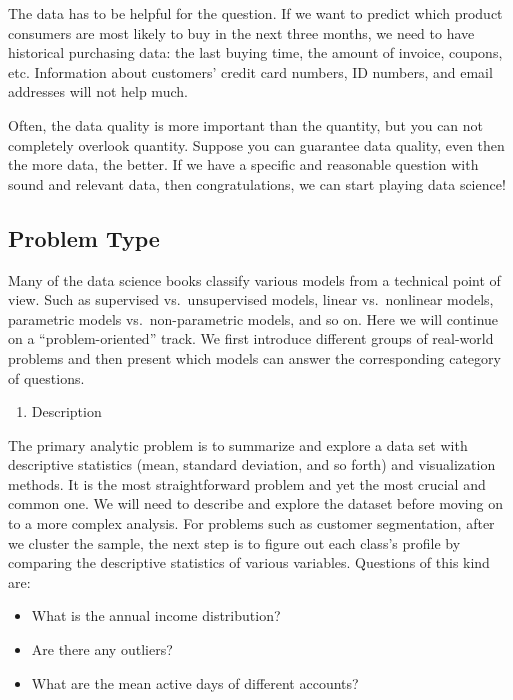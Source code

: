\documentclass[
  12pt,
]{krantz}
\providecommand{\tightlist}{%
  \setlength{\itemsep}{0pt}\setlength{\parskip}{0pt}}
\begin{document}
The data has to be helpful for the question. If we want to predict which product consumers are most likely to buy in the next three months, we need to have historical purchasing data: the last buying time, the amount of invoice, coupons, etc. Information about customers' credit card numbers, ID numbers, and email addresses will not help much.

Often, the data quality is more important than the quantity, but you can not completely overlook quantity. Suppose you can guarantee data quality, even then the more data, the better. If we have a specific and reasonable question with sound and relevant data, then congratulations, we can start playing data science!

\hypertarget{problem-type}{%
\subsection{Problem Type}\label{problem-type}}

Many of the data science books classify various models from a technical point of view. Such as supervised vs.~unsupervised models, linear vs.~nonlinear models, parametric models vs.~non-parametric models, and so on. Here we will continue on a ``problem-oriented'' track. We first introduce different groups of real-world problems and then present which models can answer the corresponding category of questions.

\begin{enumerate}
\def\labelenumi{\arabic{enumi}.}
\tightlist
\item
  Description
\end{enumerate}

The primary analytic problem is to summarize and explore a data set with descriptive statistics (mean, standard deviation, and so forth) and visualization methods. It is the most straightforward problem and yet the most crucial and common one. We will need to describe and explore the dataset before moving on to a more complex analysis. For problems such as customer segmentation, after we cluster the sample, the next step is to figure out each class's profile by comparing the descriptive statistics of various variables. Questions of this kind are:

\begin{itemize}
\tightlist
\item
  What is the annual income distribution?
\item
  Are there any outliers?
\item
  What are the mean active days of different accounts?
\end{itemize}
\end{document}
